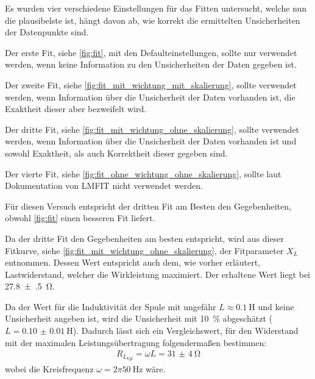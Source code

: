 \documentclass[11pt,ngerman]{scrartcl}
\begin{document}
Es wurden vier verschiedene Einstellungen für das Fitten untersucht,
welche nun die plausibelste ist, hängt davon ab, wie korrekt die ermittelten
Unsicherheiten der Datenpunkte sind.

Der erste Fit, siehe \autoref{fig:fit}, mit den Defaulteinstellungen, sollte nur verwendet werden, wenn
keine Information zu den Unsicherheiten der Daten gegeben ist.

Der zweite Fit, siehe \autoref{fig:fit_mit_wichtung_mit_skalierung}, sollte
verwendet werden, wenn Information über die Unsicherheit der Daten vorhanden
ist, die Exaktheit dieser aber bezweifelt wird.

Der dritte Fit, siehe \autoref{fig:fit_mit_wichtung_ohne_skalierung}, sollte
verwendet werden, wenn Information über die Unsicherheit der Daten vorhanden
ist und sowohl Exaktheit, als auch Korrektheit dieser gegeben sind.

Der vierte Fit, siehe \autoref{fig:fit_ohne_wichtung_ohne_skalierung}, sollte
laut Dokumentation von LMFIT \cite{LmFitNewville2014} nicht verwendet werden.

Für diesen Versuch entspricht der dritten Fit am Besten den Gegebenheiten,
obwohl \autoref{fig:fit} einen besseren Fit liefert.

Da der dritte Fit den Gegebenheiten am besten entspricht, wird aus dieser
Fitkurve, siehe \autoref{fig:fit_mit_wichtung_ohne_skalierung}, der
Fitparameter $X_L$ entnommen. Dessen Wert entspricht auch dem, wie vorher
erläutert, Lastwiderstand, welcher die Wirkleistung maximiert. Der erhaltene Wert liegt
bei \SI{27.8(5)}{\ohm}.

Da der Wert für die Induktivität der Spule mit ungefähr $L \approx
	\SI{0.1}{\henry}$ und keine Unsicherheit angeben ist, wird die Unsicherheit
mit \SI{10}{\percent} abgeschätzt ($L = \SI{0.10(1)}{\henry}$). Dadurch lässt
sich ein Vergleichswert, für den Widerstand mit der maximalen
Leistungsübertragung folgendermaßen bestimmen:
\begin{align*}
	R_{L_{Vgl}} = \omega L = \SI{31(4)}{\ohm}
\end{align*}
wobei die Kreisfrequenz $\omega = 2 \pi \SI{50}{\Hz}$ wäre.
\end{document}
